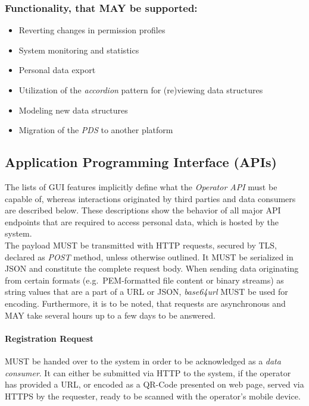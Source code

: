 \documentclass[12pt,english,a4paper,titlepage,cleardoublepage=empty,dottedtoc]{report}
\providecommand{\tightlist}{%
  \setlength{\itemsep}{0pt}\setlength{\parskip}{0pt}}
\begin{document}
\subsubsection{Functionality, that MAY be
supported:}\label{functionality-that-may-be-supported}

\begin{itemize}
\tightlist
\item
  Reverting changes in permission profiles
\item
  System monitoring and statistics
\item
  Personal data export
\item
  Utilization of the \emph{accordion} pattern for (re)viewing data
  structures
\item
  Modeling new data structures
\item
  Migration of the \emph{PDS} to another platform
\end{itemize}

\subsection{Application Programming Interface
(APIs)}\label{application-programming-interface-apis}

The lists of GUI features implicitly define what the \emph{Operator API}
must be capable of, whereas interactions originated by third parties and
data consumers are described below. These descriptions show the behavior
of all major API endpoints that are required to access personal data,
which is hosted by the system.\\
The payload MUST be transmitted with HTTP requests, secured by TLS,
declared as \emph{POST} method, unless otherwise outlined. It MUST be
serialized in JSON and constitute the complete request body. When
sending data originating from certain formats (e.g.~PEM-formatted file
content or binary streams) as string values that are a part of a URL or
JSON, \emph{base64url} MUST be used for encoding. Furthermore, it is to
be noted, that requests are asynchronous and MAY take several hours up
to a few days to be answered.

\paragraph{Registration Request}\label{spec_api_registration-request}

MUST be handed over to the system in order to be acknowledged as a
\emph{data consumer}. It can either be submitted via HTTP to the system,
if the operator has provided a URL, or encoded as a QR-Code presented on
web page, served via HTTPS by the requester, ready to be scanned with
the operator's mobile device.
\end{document}
